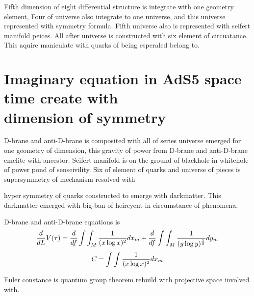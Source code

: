 \documentclass{jsarticle}
\begin{document}
{  Fifth dimension of eight differential structure is integrate with one geometry element,
Four of universe also integrate to one universe, and this universe represented with symmetry formula.
Fifth universe also is represented with seifert manifold peices.
All after universe is constructed with six element of circuatance.
This aquire maniculate with quarks of being esperaled belong to.

\section{Imaginary equation in AdS5 space time create with \\
       dimension of symmetry}

  D-brane and anti-D-brane is composited with all of series universe emerged for one geometry of 
dimension, this gravity of power from D-brane and anti-D-brane emelite with ancestor.
Seifert manifold is on the ground of blackhole in whitehole of power pond of senseivility.
Six of element of quarks and universe of pieces is supersymmetry of mechanism resolved with

hyper symmetry of quarks constructed to emerge with darkmatter.
This darkmatter emerged with big-ban of heircyent in circumstance of phenomena.

  D-brane and anti-D-brane equations is
  $$ {d \over dL}V(\tau) = {d \over df}\int \int_M {1 \over (x \log x)^2}dx_m
  + {d \over df}\int \int_M {1 \over (y \log y)^{1 \over 2}}dy_m $$
  $$ C = \int \int {1 \over (x \log x)^2}dx_m $$

  Euler constance is quantum group theorem rebuild with projective space involved with.


}
\end{document}
